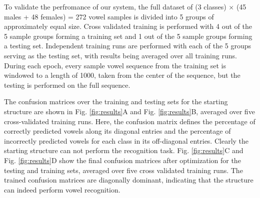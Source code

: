 To validate the perfromance of our system, the full dataset of (3 classes) $\times$ (45 males + 48 females) = 272 vowel samples is divided into 5 groups of approximately equal size.
Cross validated training is performed with 4 out of the 5 sample groups forming a training set and 1 out of the 5 sample groups forming a testing set.
Independent training runs are performed with each of the 5 groups serving as the testing set, with results being averaged over all training runs. 
During each epoch, every sample vowel sequence from the training set is windowed to a length of 1000, taken from the center of the sequence, but the testing is performed on the full sequence.



The confusion matrices over the training and testing sets for the starting structure are shown in Fig. \ref{fig:results}A and Fig. \ref{fig:results}B, averaged over five cross-validated training runs.
Here, the confusion matrix defines the percentage of correctly predicted vowels along its diagonal entries and the percentage of incorrectly predicted vowels for each class in its off-diagonal entries.
Clearly the starting structure can not perform the recognition task.
Fig. \ref{fig:results}C and Fig. \ref{fig:results}D show the final confusion matrices after optimization for the testing and training sets, averaged over five cross validated training runs.
The trained confusion matrices are diagonally dominant, indicating that the structure can indeed perform vowel recognition.

